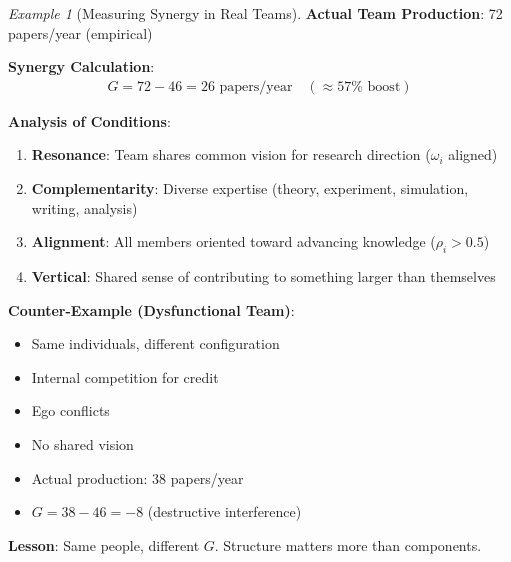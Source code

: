 \documentclass[11pt,a4paper]{article}
\theoremstyle{definition}
\theoremstyle{remark}
\newtheorem{example}{Example}[section]
\begin{document}
\begin{enumerate}
\begin{example}[Measuring Synergy in Real Teams]
\textbf{Actual Team Production}: 72 papers/year (empirical)

\textbf{Synergy Calculation}:
\begin{align}
G = 72 - 46 = 26 \text{ papers/year} \quad (\approx 57\% \text{ boost})
\end{align}

\textbf{Analysis of Conditions}:
\begin{enumerate}
    \item \textbf{Resonance}: Team shares common vision for research direction (\(\omega_i\) aligned)
    \item \textbf{Complementarity}: Diverse expertise (theory, experiment, simulation, writing, analysis)
    \item \textbf{Alignment}: All members oriented toward advancing knowledge (\(\rho_i > 0.5\))
    \item \textbf{Vertical}: Shared sense of contributing to something larger than themselves
\end{enumerate}

\textbf{Counter-Example (Dysfunctional Team)}:
\begin{itemize}
    \item Same individuals, different configuration
    \item Internal competition for credit
    \item Ego conflicts
    \item No shared vision
    \item Actual production: 38 papers/year
    \item \(G = 38 - 46 = -8\) (destructive interference)
\end{itemize}

\textbf{Lesson}: Same people, different \(G\). Structure matters more than components.
\end{example}

\begin{figure}[H]
\centering
{}
\end{figure}
\end{enumerate}
\end{document}
